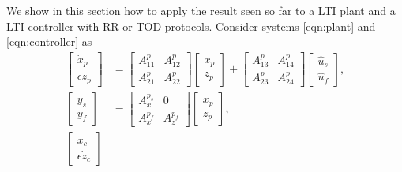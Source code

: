 We show in this section how to apply the result seen so far to a LTI plant and a LTI controller with RR or TOD protocols. Consider systems \eqref{eqn:plant} and \eqref{eqn:controller} as
%
\begin{equation}
\begin{aligned}
    \left[ \begin{smallmatrix}
        \dot{x}_p \\ \epsilon \dot{z}_p
    \end{smallmatrix} \right]
    &=
    \left[ \begin{smallmatrix}
        A_{11}^p & A_{12}^p \\ A_{21}^p & A_{22}^p
    \end{smallmatrix} \right]
    \left[ \begin{smallmatrix}
        x_p \\ z_p
    \end{smallmatrix} \right] 
    + 
    \left[ \begin{smallmatrix}
        A_{13}^p & A_{14}^p \\ A_{23}^p & A_{24}^p
    \end{smallmatrix} \right]
    \left[ \begin{smallmatrix}
        \hat{u}_s \\ \hat{u}_f
    \end{smallmatrix} \right],
    \\
    \left[ \begin{smallmatrix}
        y_s \\ y_f
    \end{smallmatrix} \right]
    &=
    \left[ \begin{smallmatrix}
        A_x^{p_s} & 0 \\ A_x^{p_f} & A_z^{p_f}
    \end{smallmatrix} \right]
    \left[ \begin{smallmatrix}
        x_p \\ z_p
    \end{smallmatrix} \right],
    \\ 
    \left[ \begin{smallmatrix}
        \dot{x}_c \\ \epsilon \dot{z}_c
    \end{smallmatrix} \right]

\end{aligned}
\end{equation}
